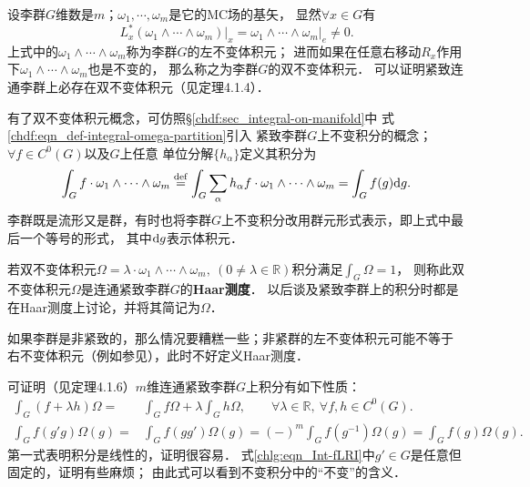 设李群$G$维数是$m$；$\omega_1,\cdots,\omega_m$是它的MC场的基矢，
显然$\forall x\in G$有
\begin{equation}
    L_x^* (\omega_1 \wedge\cdots\wedge\omega_m)|_{x} = \left.\omega_1 \wedge\cdots\wedge\omega_m\right|_{e}
    \neq 0.
\end{equation}
上式中的$\omega_1 \wedge\cdots\wedge\omega_m$称为李群$G$的左不变体积元；
进而如果在任意右移动$R_x$作用下$\omega_1 \wedge\cdots\wedge\omega_m$也是不变的，
那么称之为李群$G$的{\heiti 双不变体积元}．
可以证明紧致连通李群上必存在双不变体积元（见\parencite[p. 288]{xuyc-2001}定理4.1.4）．


有了双不变体积元概念，可仿照\S\ref{chdf:sec_integral-on-manifold}中
式\eqref{chdf:eqn_def-integral-omega-partition}引入
紧致李群$G$上{\heiti 不变积分}的概念；$\forall f\in C^0(G)$以及$G$上任意
单位分解$\{h_\alpha\}$定义其积分为
\begin{equation}
    \int_{G} f \cdot \omega_1 \wedge\cdots\wedge\omega_m \overset{\mathrm {def}}{=} 
    \int_{G} \sum_{\alpha}  h_\alpha f \cdot  \omega_1 \wedge\cdots\wedge\omega_m 
    =\int_{G} f(g) {\rm d}g .
\end{equation}
李群既是流形又是群，有时也将李群$G$上不变积分改用群元形式表示，即上式中最后一个等号的形式，
其中${\rm d}g$表示体积元．


若双不变体积元$\Omega=\lambda \cdot \omega_1 \wedge\cdots\wedge\omega_m,\ 
(0\neq\lambda\in \mathbb{R})$积分满足$\int_{G}\Omega {=} 1$，
则称此双不变体积元$\Omega$是连通紧致李群$G$的{\heiti \bfseries Haar测度}．
以后谈及紧致李群上的积分时都是在Haar测度上讨论，并将其简记为$\Omega$．

如果李群是非紧致的，那么情况要糟糕一些；非紧群的左不变体积元可能不等于
右不变体积元（例如参见\parencite[\S 6.1]{Miller-1973}），此时不好定义Haar测度．

可证明（见\parencite[p.289]{xuyc-2001}定理4.1.6）$m$维连通紧致李群$G$上积分有如下性质：
\begin{align}
    \int_{G} (f+\lambda h) \Omega =& \int_{G} f \Omega +\lambda \int_{G}  h \Omega,
    \qquad \forall \lambda\in \mathbb{R},\  \forall f,h\in C^0(G). \\
    \int_{G} f(g' g) \Omega(g)=& \int_{G} f(g g') \Omega(g)
    = (-)^m \int_{G} f(g^{-1}) \Omega(g) = \int_{G} f(g) \Omega(g) .
    \label{chlg:eqn_Int-fLRI}
\end{align}  %
第一式表明积分是线性的，证明很容易．
式\eqref{chlg:eqn_Int-fLRI}中$g'\in G$是任意但固定的，证明有些麻烦；
由此式可以看到不变积分中的“不变”的含义． 


